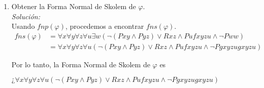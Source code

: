 \documentclass[letterpaper,12pt]{article}
\begin{document}
\begin{enumerate}
    \item Obtener la Forma Normal de Skolem de $\varphi$. \\
    \textit{Solución:} \\
    Usando $fnp(\varphi)$, procedemos a encontrar $fns(\varphi)$.
    \begin{align*}
        fns(\varphi) 
        &= \forall x \forall y \forall z \forall u \exists w
        (\neg (Pxy \land Pyz) \lor Rxz \land Pufxyzu \land \neg Pww) \\
        &= \forall x \forall y \forall z \forall u
        (\neg (Pxy \land Pyz) \lor Rxz \land Pufxyzu \land \neg Pgxyzugxyzu)
    \end{align*}

    Por lo tanto, la Forma Normal de Skolem de $\varphi$ es 
    \begin{center}
        $¿\forall x \forall y \forall z \forall u
        (\neg (Pxy \land Pyz) \lor Rxz \land Pufxyzu \land \neg Pgxyzugxyzu)$
    \end{center}

\end{enumerate}
\end{document}
